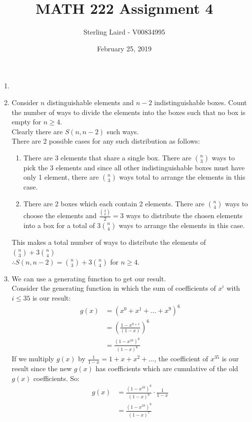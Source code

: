 \documentclass[11pt]{article}
\title{MATH 222 Assignment 4}
\author{Sterling Laird - V00834995}
\date{February 25, 2019}
\begin{document}
\maketitle
\pagebreak

\begin{enumerate}[]
\item
\item
Consider $n$ distinguishable elements and $n-2$ indistinguishable boxes. Count the number of ways to divide the elements into the boxes such that no box is empty for $n\geq 4$.\\
Clearly there are $S(n,n-2)$ such ways.\\
There are 2 possible cases for any such distribution as follows:
	\begin{enumerate}
	\item There are 3 elements that share a single box. There are $\binom{n}{3}$ ways to pick the 3 elements and since all other indistinguishable boxes must have only 1 element, there are $\binom{n}{3}$ ways total to arrange the elements in this case.
	\item There are 2 boxes which each contain 2 elements. There are $\binom{n}{4}$ ways to choose the elements and $\frac{\binom{4}{2}}{2} = 3$ ways to distribute the chosen elements into a box for a total of $3\binom{n}{4}$ ways to arrange the elements in this case.
	\end{enumerate}
This makes a total number of ways to distribute the elements of $\binom{n}{3}+3\binom{n}{4}$\\
$\therefore S(n,n-2)=\binom{n}{3}+3\binom{n}{4}$ for $n\geq 4$.
\item
We can use a generating function to get our result.\\
Consider the generating function in which the sum of coefficients of $x^i$ with $i\leq 35$ is our result:
	\begin{align}
		g(x)&=(x^0+x^1+...+x^9)^6 \nonumber\\
		&=(\frac{1-x^{9+1}}{(1-x)})^6 \nonumber\\
		&=\frac{(1-x^{10})^6}{(1-x)^6} \nonumber
	\end{align}
If we multiply $g(x)$ by $\frac{1}{1-x}=1+x+x^2+...$, the coefficient of $x^{35}$ is our result since the new $g(x)$ has coefficients which are cumulative of the old $g(x)$ coefficients. So:
	\begin{align}
		g(x)&=\frac{(1-x^{10})^6}{(1-x)^6}\cdot \frac{1}{1-x} \nonumber\\
		&=\frac{(1-x^{10})^6}{(1-x)^7} \nonumber\\

\end{align}
\end{enumerate}
\end{document}

